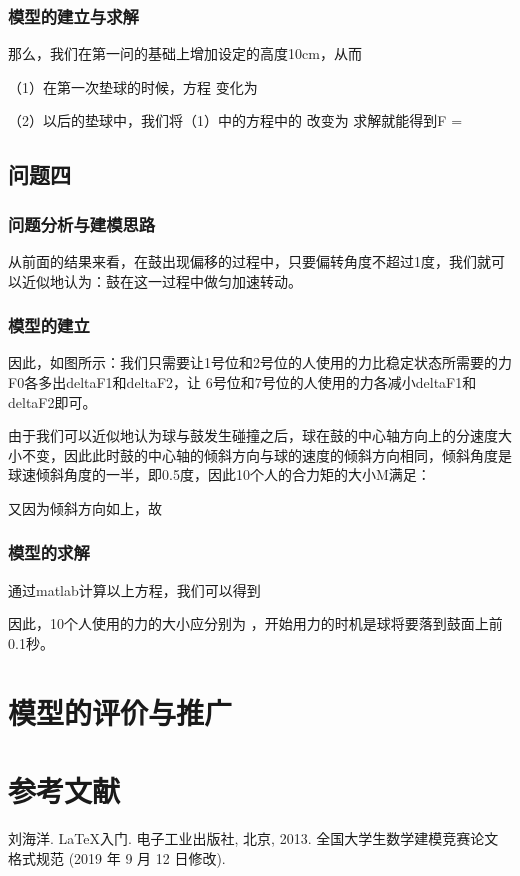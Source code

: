 \documentclass[withoutpreface,bwprint]{cumcmthesis} %
\begin{document}
	\subsubsection{模型的建立与求解}
那么，我们在第一问的基础上增加设定的高度10cm，从而\par
（1）在第一次垫球的时候，方程 变化为\par
（2）以后的垫球中，我们将（1）中的方程中的 改变为 
求解就能得到F = 


\subsection{问题四}
	\subsubsection{问题分析与建模思路}
从前面的结果来看，在鼓出现偏移的过程中，只要偏转角度不超过1度，我们就可以近似地认为：鼓在这一过程中做匀加速转动。

	\subsubsection{模型的建立}
因此，如图所示：我们只需要让1号位和2号位的人使用的力比稳定状态所需要的力F0各多出deltaF1和deltaF2，让 6号位和7号位的人使用的力各减小deltaF1和deltaF2即可。

由于我们可以近似地认为球与鼓发生碰撞之后，球在鼓的中心轴方向上的分速度大小不变，因此此时鼓的中心轴的倾斜方向与球的速度的倾斜方向相同，倾斜角度是球速倾斜角度的一半，即0.5度，因此10个人的合力矩的大小M满足：

又因为倾斜方向如上，故


	\subsubsection{模型的求解}
通过matlab计算以上方程，我们可以得到

因此，10个人使用的力的大小应分别为      ，开始用力的时机是球将要落到鼓面上前0.1秒。
\section{模型的评价与推广}


\section{参考文献}

\begin{thebibliography}{9}%
    刘海洋.
    \newblock \LaTeX {}入门\allowbreak[J].
    \newblock 电子工业出版社, 北京, 2013.
    全国大学生数学建模竞赛论文格式规范 (2019 年 9 月 12 日修改).
\end{thebibliography}
\end{document}
